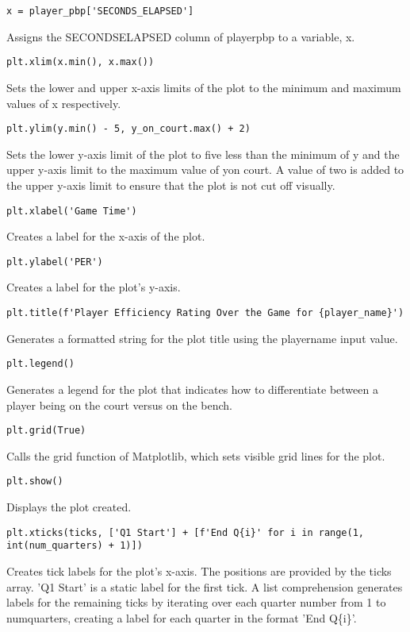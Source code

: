 \documentclass{article}
\begin{document}
\begin{lstlisting}
x = player_pbp['SECONDS_ELAPSED']
\end{lstlisting}
Assigns the SECONDS\textunderscore ELAPSED column of player\textunderscore pbp to a variable, x.
\begin{lstlisting}
plt.xlim(x.min(), x.max())
\end{lstlisting}
Sets the lower and upper x-axis limits of the plot to the minimum and maximum values of x respectively.
\begin{lstlisting}
plt.ylim(y.min() - 5, y_on_court.max() + 2)
\end{lstlisting}
Sets the lower y-axis limit of the plot to five less than the minimum of y and the upper y-axis limit to the maximum value of y\textunderscore on \textunderscore court. A value of two is added to the upper y-axis limit to ensure that the plot is not cut off visually.
\begin{lstlisting}
plt.xlabel('Game Time')
\end{lstlisting}
Creates a label for the x-axis of the plot.
\begin{lstlisting}
plt.ylabel('PER')
\end{lstlisting}
Creates a label for the plot's y-axis.
\begin{lstlisting}
plt.title(f'Player Efficiency Rating Over the Game for {player_name}')
\end{lstlisting}
Generates a formatted string for the plot title using the player\textunderscore name input value.
\begin{lstlisting}
plt.legend()
\end{lstlisting}
Generates a legend for the plot that indicates how to differentiate between a player being on the court versus on the bench.
\begin{lstlisting}
plt.grid(True)
\end{lstlisting}
Calls the grid function of Matplotlib, which sets visible grid lines for the plot.
\begin{lstlisting}
plt.show()
\end{lstlisting}
Displays the plot created.
\begin{lstlisting}
plt.xticks(ticks, ['Q1 Start'] + [f'End Q{i}' for i in range(1, int(num_quarters) + 1)])
\end{lstlisting}
Creates tick labels for the plot's x-axis. The positions are provided by the ticks array. 'Q1 Start' is a static label for the first tick. A list comprehension generates labels for the remaining ticks by iterating over each quarter number from 1 to num\textunderscore quarters, creating a label for each quarter in the format 'End Q\{i\}'.
\end{document}
